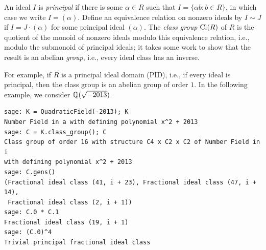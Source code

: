 \documentclass{book}
\begin{document}
An ideal $I$ is {\em principal} if there is some $\alpha \in R$ such
that $I = \{\alpha b : b \in R\}$, in which case we write $I=(\alpha)$.
Define an equivalence relation on nonzero ideals by
$I\sim J$ if $I=J\cdot (\alpha)$ for some principal ideal
$(\alpha)$.
The {\em class group} $\operatorname{Cl}(R)$ of $R$ is the quotient of the monoid of
nonzero ideals modulo this equivalence relation, i.e., modulo the
submonoid of principal ideals; it takes some work to show that
the result is an abelian {\em group}, i.e., every ideal class
has an inverse.

For example, if $R$ is a principal ideal domain (PID), i.e., if
every ideal is principal, then the class group is an abelian group
of order $1$.   In the following example, we consider $\mathbb{Q}(\sqrt{-2013})$.

\begin{lstlisting}
sage: K = QuadraticField(-2013); K
Number Field in a with defining polynomial x^2 + 2013
sage: C = K.class_group(); C
Class group of order 16 with structure C4 x C2 x C2 of Number Field in i
with defining polynomial x^2 + 2013
sage: C.gens()
(Fractional ideal class (41, i + 23), Fractional ideal class (47, i + 14),
 Fractional ideal class (2, i + 1))
sage: C.0 * C.1
Fractional ideal class (19, i + 1)
sage: (C.0)^4
Trivial principal fractional ideal class
\end{lstlisting}
\end{document}
